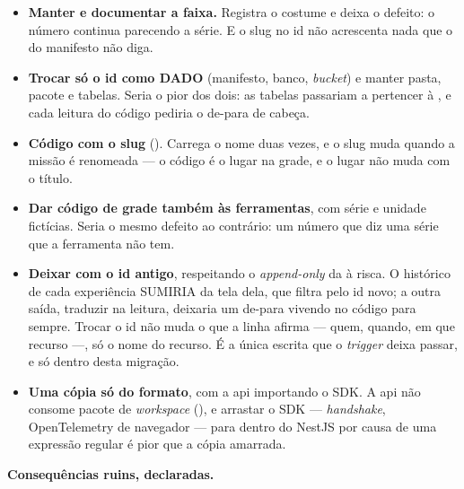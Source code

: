 \begin{itemize}
  \item \textbf{Manter  e documentar a faixa.} Registra o
    costume e deixa o defeito: o número continua parecendo a série. E o slug no
    id não acrescenta nada que o  do manifesto não diga.
  \item \textbf{Trocar só o id como DADO} (manifesto, banco, \emph{bucket}) e
    manter pasta, pacote e tabelas. Seria o pior dos dois: as tabelas
     passariam a pertencer à , e cada leitura do
    código pediria o de-para de cabeça.
  \item \textbf{Código com o slug} (). Carrega o nome
    duas vezes, e o slug muda quando a missão é renomeada --- o código é o lugar
    na grade, e o lugar não muda com o título.
  \item \textbf{Dar código de grade também às ferramentas}, com série e unidade
    fictícias. Seria o mesmo defeito ao contrário: um número que diz uma série
    que a ferramenta não tem.
  \item \textbf{Deixar  com o id antigo}, respeitando o
    \emph{append-only} da  à risca. O histórico de cada
    experiência SUMIRIA da tela dela, que filtra pelo id novo; a outra saída,
    traduzir na leitura, deixaria um de-para vivendo no código para sempre.
    Trocar o id não muda o que a linha afirma --- quem, quando, em que recurso
    ---, só o nome do recurso. É a única escrita que o \emph{trigger} deixa
    passar, e só dentro desta migração.
  \item \textbf{Uma cópia só do formato}, com a api importando o SDK. A api não
    consome pacote de \emph{workspace} (), e arrastar o
    SDK --- \emph{handshake}, OpenTelemetry de navegador --- para dentro do
    NestJS por causa de uma expressão regular é pior que a cópia amarrada.
\end{itemize}

\textbf{Consequências ruins, declaradas.}

